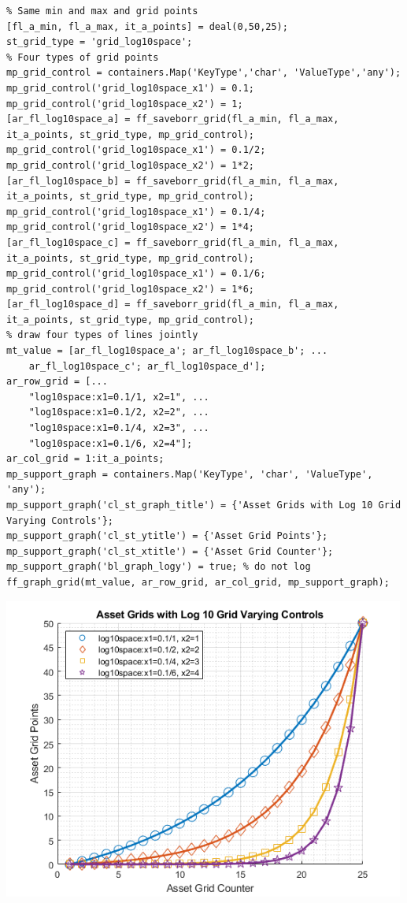 \documentclass[
]{book}
\begin{document}
\begin{verbatim}
% Same min and max and grid points
[fl_a_min, fl_a_max, it_a_points] = deal(0,50,25);
st_grid_type = 'grid_log10space';
% Four types of grid points
mp_grid_control = containers.Map('KeyType','char', 'ValueType','any');
mp_grid_control('grid_log10space_x1') = 0.1;
mp_grid_control('grid_log10space_x2') = 1;
[ar_fl_log10space_a] = ff_saveborr_grid(fl_a_min, fl_a_max, it_a_points, st_grid_type, mp_grid_control);
mp_grid_control('grid_log10space_x1') = 0.1/2;
mp_grid_control('grid_log10space_x2') = 1*2;
[ar_fl_log10space_b] = ff_saveborr_grid(fl_a_min, fl_a_max, it_a_points, st_grid_type, mp_grid_control);
mp_grid_control('grid_log10space_x1') = 0.1/4;
mp_grid_control('grid_log10space_x2') = 1*4;
[ar_fl_log10space_c] = ff_saveborr_grid(fl_a_min, fl_a_max, it_a_points, st_grid_type, mp_grid_control);
mp_grid_control('grid_log10space_x1') = 0.1/6;
mp_grid_control('grid_log10space_x2') = 1*6;
[ar_fl_log10space_d] = ff_saveborr_grid(fl_a_min, fl_a_max, it_a_points, st_grid_type, mp_grid_control);
% draw four types of lines jointly
mt_value = [ar_fl_log10space_a'; ar_fl_log10space_b'; ...
    ar_fl_log10space_c'; ar_fl_log10space_d'];
ar_row_grid = [...
    "log10space:x1=0.1/1, x2=1", ...
    "log10space:x1=0.1/2, x2=2", ...
    "log10space:x1=0.1/4, x2=3", ...
    "log10space:x1=0.1/6, x2=4"];
ar_col_grid = 1:it_a_points;
mp_support_graph = containers.Map('KeyType', 'char', 'ValueType', 'any');
mp_support_graph('cl_st_graph_title') = {'Asset Grids with Log 10 Grid Varying Controls'};
mp_support_graph('cl_st_ytitle') = {'Asset Grid Points'};
mp_support_graph('cl_st_xtitle') = {'Asset Grid Counter'};
mp_support_graph('bl_graph_logy') = true; % do not log
ff_graph_grid(mt_value, ar_row_grid, ar_col_grid, mp_support_graph);
\end{verbatim}

\includegraphics[width=5.20833in,height=\textheight]{img/fx_saveborr_grid_images/figure_2.png}
\end{document}
